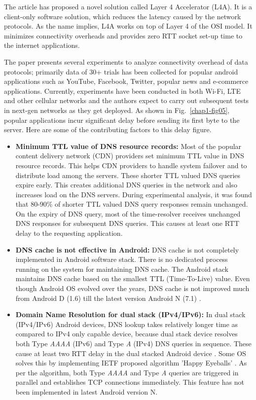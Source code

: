 \begin{multicols}{2}
The article \cite{art1-key13} has proposed a novel solution called Layer 4 Accelerator (L4A). It is a client-only software solution, which reduces the latency caused by the network protocols. As the name implies, L4A works on top of Layer 4 of the OSI model. It minimizes connectivity overheads and provides zero RTT socket set-up time to the internet applications.

The paper \cite{art1-key13} presents several experiments to analyze connectivity overhead of data protocols; primarily data of 30+ trials has been collected for popular android applications such as YouTube, Facebook, Twitter, popular news and e-commerce applications. Currently, experiments have been conducted in both Wi-Fi, LTE  and other cellular networks and the authors expect to carry out subsequent tests in next-gen networks as they get deployed.  As shown in Fig.~\ref{chap1-fig05}, popular applications incur significant delay before sending its first byte to the server. Here are some of the contributing factors \cite{art1-key13} to this delay figure.
\begin{itemize}
\item  {\bf Minimum TTL value of DNS resource records:} Most of the popular content delivery network (CDN) providers set minimum TTL value in DNS resource records. This helps CDN providers to handle system failover and to distribute load among the servers. These shorter TTL valued DNS queries expire early. This creates additional DNS queries in the network and also increases load on the DNS servers. During experimental analysis, it was found that 80-90\% of shorter TTL valued DNS query responses remain unchanged. On the expiry of DNS query, most of the time-resolver receives unchanged DNS responses for subsequent DNS queries. This causes at least one RTT delay to the requesting application.
\item{\bf DNS cache is not effective in Android:} DNS cache is not completely implemented in Android software stack. There is no dedicated process running on the system for maintaining DNS cache. The Android stack maintains DNS cache based on the smallest TTL (Time-To-Live) value. Even though Android OS evolved over the years, DNS cache is not improved much from Android D (1.6) till the latest version Android N (7.1) \cite{art1-key14}. 
\item {\bf Domain Name Resolution for dual stack (IPv4/IPv6):} In dual stack (IPv4/IPv6) Android devices, DNS lookup takes relatively longer time as compared to IPv4 only capable device, because dual stack device resolves both Type \textit{AAAA} (IPv6) and Type \textit{A} (IPv4) DNS queries in sequence. These cause at least two RTT delay in the dual stacked Android device \cite{art1-key15}. Some OS solves this by implementing IETF proposed algorithm ’Happy Eyeballs’ \cite{art1-key16}. As per the algorithm, both Type \textit{AAAA} and Type \textit{A} queries are triggered in parallel and establishes TCP connections immediately. This feature has not been implemented in latest Android version N.

\end{itemize}
\end{multicols}
